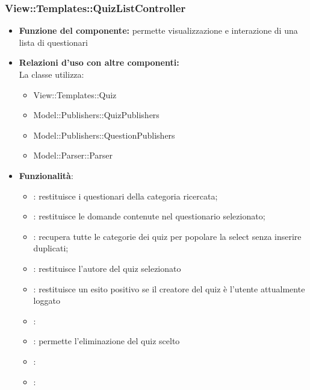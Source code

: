 \subsubsection{View::Templates::QuizListController}
\begin{itemize}
\item\textbf{Funzione del componente:} permette visualizzazione e interazione di una lista di questionari
				\item\textbf{Relazioni d'uso con altre componenti:}\\
La classe utilizza:
	\begin{itemize}
		\item View::Templates::Quiz
		\item Model::Publishers::QuizPublishers
		\item Model::Publishers::QuestionPublishers
		\item Model::Parser::Parser
	\end{itemize}
\item\textbf{Funzionalità}:
	\begin{itemize}
		\item{}: restituisce i questionari della categoria ricercata;\\
		\item{}: restituisce le domande contenute nel questionario selezionato;\\
		\item{}: recupera tutte le categorie dei quiz per popolare la select senza inserire duplicati;\\
		\item{}: restituisce l'autore del quiz selezionato\\
		\item{}: restituisce un esito positivo se il creatore del quiz è l'utente attualmente loggato\\
		\item{}:\\
		\item{}: permette l'eliminazione del quiz scelto\\
		\item{}:\\
		\item\code{+}:\\
	\end{itemize}
\end{itemize}

